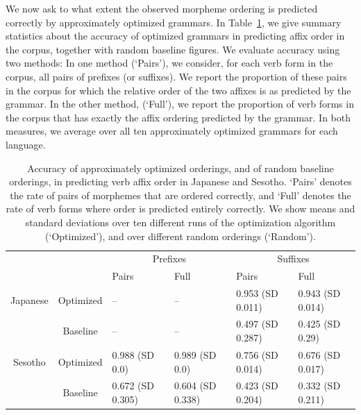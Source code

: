 We now ask to what extent the observed morpheme ordering is predicted correctly by approximately optimized grammars.
In Table~\ref{tab:morph-acc}, we give summary statistics about the accuracy of optimized grammars in predicting affix order in the corpus, together with random baseline figures.
We evaluate accuracy using two methods:
In one method (`Pairs'), we consider, for each verb form in the corpus, all pairs of prefixes (or suffixes).
We report the proportion of these pairs in the corpus for which the relative order of the two affixes is as predicted by the grammar.
In the other method, (`Full'), we report the proportion of verb forms in the corpus that has exactly the affix ordering predicted by the grammar.
In both measures, we average over all ten approximately optimized grammars for each language.

\begin{table}
\begin{tabular}{cc||ll|ll}
             &              & \multicolumn{2}{c}{Prefixes}    & \multicolumn{2}{|c}{Suffixes} \\
             &              & Pairs & Full & Pairs & Full \\ \hline\hline
Japanese    & Optimized   & -- &  -- &   0.953 (SD 0.011) & 0.943 (SD 0.014) \\ %
             & Baseline    & -- & --  & 0.497 (SD 0.287) & 0.425 (SD 0.29) \\ \hline %
Sesotho &   Optimized  &  0.988 (SD 0.0) & 0.989 (SD 0.0) & 0.756 (SD 0.014) & 0.676 (SD 0.017) \\
&   Baseline  &  0.672 (SD 0.305) & 0.604 (SD 0.338) & 0.423 (SD 0.204) & 0.332 (SD 0.211) \\ 
\end{tabular}
\caption{Accuracy of approximately optimized orderings, and of random baseline orderings, in predicting verb affix order in Japanese and Sesotho. `Pairs' denotes the rate of pairs of morphemes that are ordered correctly, and `Full' denotes the rate of verb forms where order is predicted entirely correctly. We show means and standard deviations over ten different runs of the optimization algorithm (`Optimized'), and over different random orderings (`Random').}\label{tab:morph-acc}
\end{table}

